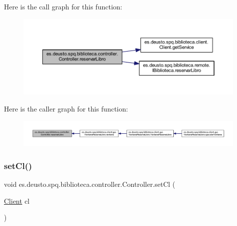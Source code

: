Here is the call graph for this function\+:
\nopagebreak
\begin{figure}[H]
\begin{center}
\leavevmode
\includegraphics[width=350pt]{classes_1_1deusto_1_1spq_1_1biblioteca_1_1controller_1_1_controller_a3c1193157badc8d2dad7125e8e0658f6_cgraph}
\end{center}
\end{figure}
Here is the caller graph for this function\+:
\nopagebreak
\begin{figure}[H]
\begin{center}
\leavevmode
\includegraphics[width=350pt]{classes_1_1deusto_1_1spq_1_1biblioteca_1_1controller_1_1_controller_a3c1193157badc8d2dad7125e8e0658f6_icgraph}
\end{center}
\end{figure}
\mbox{\label{classes_1_1deusto_1_1spq_1_1biblioteca_1_1controller_1_1_controller_afe5f91697abeb5864f3f21faa89c3f01}} 
\subsubsection{\texorpdfstring{set\+Cl()}{setCl()}}
{\footnotesize\ttfamily void es.\+deusto.\+spq.\+biblioteca.\+controller.\+Controller.\+set\+Cl (\begin{DoxyParamCaption}\item[{\mbox{\hyperlink{classes_1_1deusto_1_1spq_1_1biblioteca_1_1client_1_1_client}{Client}}}]{cl }\end{DoxyParamCaption})}

